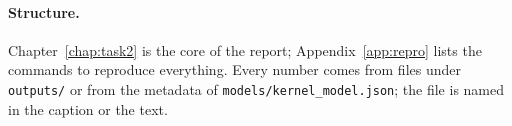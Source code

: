 \paragraph{Structure.} Chapter~\ref{chap:task2} is the core of the report; Appendix~\ref{app:repro} lists the commands to reproduce everything. Every number comes from files under \texttt{outputs/} or from the metadata of \texttt{models/kernel\_model.json}; the file is named in the caption or the text.
